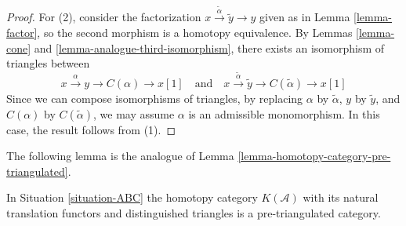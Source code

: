 \begin{proof}
\medskip\noindent
For (2), consider the factorization
$x\xrightarrow{\tilde{\alpha}}\tilde{y}\to y$
given as in Lemma \ref{lemma-factor}, so the second morphism
is a homotopy equivalence. By Lemmas \ref{lemma-cone} and
\ref{lemma-analogue-third-isomorphism}, there
exists an isomorphism of triangles between
$$
x \xrightarrow{\alpha} y \to C(\alpha) \to x[1]
\quad\text{and}\quad
x \xrightarrow{\tilde{\alpha}} \tilde{y} \to C(\tilde{\alpha}) \to x[1]
$$
Since we can compose isomorphisms of triangles, by replacing
$\alpha$ by $\tilde{\alpha}$, $y$ by $\tilde{y}$, and $C(\alpha)$ by
$C(\tilde{\alpha})$, we may assume $\alpha$ is an admissible monomorphism.
In this case, the result follows from (1).
\end{proof}

\noindent
The following lemma is the analogue of
Lemma \ref{lemma-homotopy-category-pre-triangulated}.

\begin{lemma}
\label{lemma-analogue-homotopy-category-pre-triangulated}
In Situation \ref{situation-ABC} the homotopy category $K(\mathcal{A})$
with its natural translation functors and distinguished triangles
is a pre-triangulated category.
\end{lemma}

